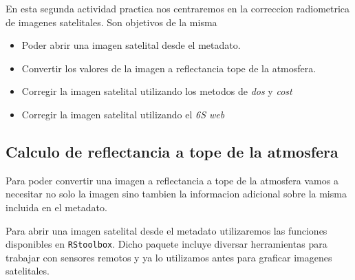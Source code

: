 
En esta segunda actividad practica nos centraremos en la correccion radiometrica
de imagenes satelitales. Son objetivos de la misma

\begin{itemize}
    \item Poder abrir una imagen satelital desde el metadato.
    \item Convertir los valores de la imagen a reflectancia tope de la
        atmosfera.
    \item Corregir la imagen satelital utilizando los metodos de \emph{dos} y
        \emph{cost}
    \item Corregir la imagen satelital utilizando el \emph{6S web}
\end{itemize}

\subsection{Calculo de reflectancia a tope de la atmosfera}

Para poder convertir una imagen a reflectancia a tope de la atmosfera vamos a
necesitar no solo la imagen sino tambien la informacion adicional sobre la misma
incluida en el metadato.

Para abrir una imagen satelital desde el metadato utilizaremos las funciones
disponibles en \texttt{RStoolbox}. Dicho paquete incluye diversar herramientas
para trabajar con sensores remotos y ya lo utilizamos antes para graficar
imagenes satelitales.

